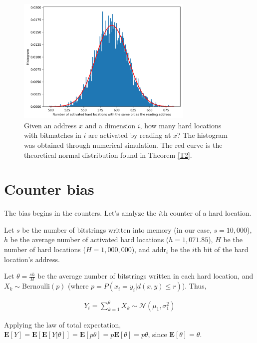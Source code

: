 \documentclass[12pt]{article}
\begin{document}
\begin{figure}[h!]
  \centering
  \includegraphics[width=0.75\textwidth]{./images02/autocorrelation/same-bit-histogram.png}

  \caption{Given an address $x$ and a dimension $i$, how many hard locations with bitmatches in $i$ are activated by reading at $x$?  The histogram was obtained through numerical simulation. The red curve is the theoretical normal distribution found in Theorem \ref{T2}.}
  \label{fig:sdm-same-bit-histogram}
\end{figure}

\section{Counter bias}

The bias begins in the counters. Let's analyze the $i$th counter of a hard location.

Let $s$ be the number of bitstrings written into memory (in our case, $s=10,000$), $h$ be the average number of activated hard locations ($h=1,071.85$), $H$ be the number of hard locations ($H=1,000,000$), and $\text{addr}_i$ be the $i$th bit of the hard location's address.

Let $\theta = \frac{sh}{H}$ be the average number of bitstrings written in each hard location, and $X_k \sim \text{Bernoulli}(p)$ (where $p = P(x_i = y_i | d(x, y) \le r)$). Thus,

\begin{align}
Y_i = \sum_{k=1}^{\theta} X_k \sim \mathcal{N}(\mu_1, \sigma_1^2)
\end{align}

Applying the law of total expectation, $\mathbf{E}[Y] = \mathbf{E}[\mathbf{E}[Y|\theta]] = \mathbf{E}[p \theta] = p \mathbf{E}[\theta] = p \theta$, since $\mathbf{E}[\theta] = \theta$.
\end{document}

